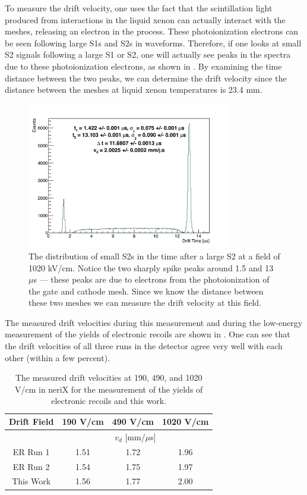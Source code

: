To measure the drift velocity, one uses the fact that the scintillation light produced from interactions in the liquid xenon can actually interact with the meshes, releasing an electron in the process.  These photoionization electrons can be seen following large S1s and S2s in waveforms.  Therefore, if one looks at small S2 signals following a large S1 or S2, one will actually see peaks in the spectra due to these photoionization electrons, as shown in .  By examining the time distance between the two peaks, we can determine the drift velocity since the distance between the meshes at liquid xenon temperatures is 23.4 mm.

\begin{figure}[t]
        \centering
	\includegraphics[width=0.8\textwidth]{nerix_drift_velocity}
	\caption{The distribution of small S2s in the time after a large S2 at a field of 1020 kV/cm.  Notice the two sharply spike peaks around 1.5 and 13 $\mu$s --- these peaks are due to electrons from the photoionization of the gate and cathode mesh.  Since we know the distance between these two meshes we can measure the drift velocity at this field.}
	\label{fig:nerix_drift_velocity}
\end{figure}


The measured drift velocities during this measurement and during the low-energy measurement of the yields of electronic recoils \cite{goetzke2016measurement} are shown in .  One can see that the drift velocities of all three runs in the detector agree very well with each other (within a few percent).

\begin{table}[b]
\centering
\def\arraystretch{1.3}
\begin{tabular}{cccc}
\hline
Drift Field & 190 V/cm & 490 V/cm & 1020 V/cm \\
\hline
 & \multicolumn{3}{c}{$v_d$ [mm/$\mu$s]} \\
\hline
ER Run 1 & 1.51 & 1.72 & 1.96 \\
ER Run 2 & 1.54 & 1.75 & 1.97 \\
This Work & 1.56 & 1.77 & 2.00 \\
\hline
\end{tabular}
\caption{The measured drift velocities at 190, 490, and 1020 V/cm in neriX for the measurement of the yields of electronic recoils \cite{goetzke2016measurement} and this work.}
\label{tab:nerix_drift_velocities}
\end{table}


